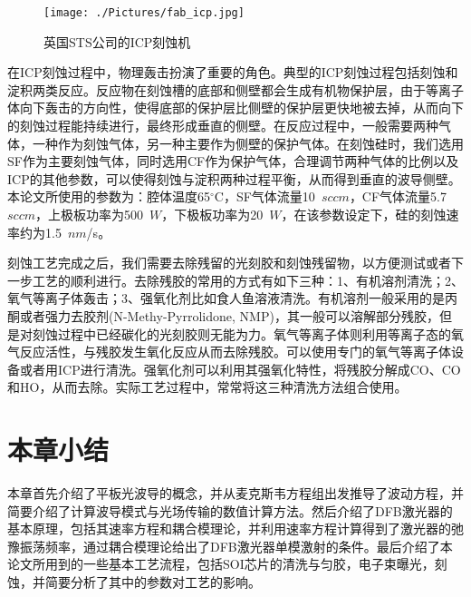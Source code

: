 \begin{figure}[htb]
	\centering
	\texttt{[image: ./Pictures/fab\_icp.jpg]}
	\captionsetup{justification=centering}
	\caption{英国STS公司的ICP刻蚀机}
	\label{fab_icp}
\end{figure}

在ICP刻蚀过程中，物理轰击扮演了重要的角色。典型的ICP刻蚀过程包括刻蚀和淀积两类反应。反应物在刻蚀槽的底部和侧壁都会生成有机物保护层，由于等离子体向下轰击的方向性，使得底部的保护层比侧壁的保护层更快地被去掉，从而向下的刻蚀过程能持续进行，最终形成垂直的侧壁。在反应过程中，一般需要两种气体，一种作为刻蚀气体，另一种主要作为侧壁的保护气体。在刻蚀硅时，我们选用SF作为主要刻蚀气体，同时选用CF作为保护气体，合理调节两种气体的比例以及ICP的其他参数，可以使得刻蚀与淀积两种过程平衡，从而得到垂直的波导侧壁。本论文所使用的参数为：腔体温度65$^{\circ}$C，SF气体流量10~$sccm$，CF气体流量5.7~$sccm$，上极板功率为500~$W$，下极板功率为20~$W$，在该参数设定下，硅的刻蚀速率约为1.5~$nm$/s。

刻蚀工艺完成之后，我们需要去除残留的光刻胶和刻蚀残留物，以方便测试或者下一步工艺的顺利进行。去除残胶的常用的方式有如下三种：1、有机溶剂清洗；2、氧气等离子体轰击；3、强氧化剂比如食人鱼溶液清洗。有机溶剂一般采用的是丙酮或者强力去胶剂(N-Methy-Pyrrolidone, NMP)，其一般可以溶解部分残胶，但是对刻蚀过程中已经碳化的光刻胶则无能为力。氧气等离子体则利用等离子态的氧气反应活性，与残胶发生氧化反应从而去除残胶。可以使用专门的氧气等离子体设备或者用ICP进行清洗。强氧化剂可以利用其强氧化特性，将残胶分解成CO、CO和HO，从而去除。实际工艺过程中，常常将这三种清洗方法组合使用。

\section{本章小结}
本章首先介绍了平板光波导的概念，并从麦克斯韦方程组出发推导了波动方程，并简要介绍了计算波导模式与光场传输的数值计算方法。然后介绍了DFB激光器的基本原理，包括其速率方程和耦合模理论，并利用速率方程计算得到了激光器的弛豫振荡频率，通过耦合模理论给出了DFB激光器单模激射的条件。最后介绍了本论文所用到的一些基本工艺流程，包括SOI芯片的清洗与匀胶，电子束曝光，刻蚀，并简要分析了其中的参数对工艺的影响。











